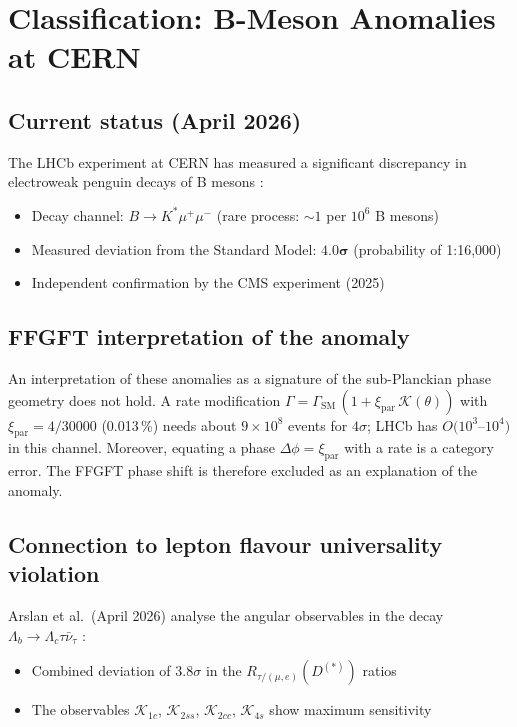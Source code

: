 	\section{Classification: B-Meson Anomalies at CERN}
	
	\subsection{Current status (April 2026)}
	
	The LHCb experiment at CERN has measured a significant discrepancy in electroweak penguin decays of B mesons \cite{CERN2026a, CERN2026b}:
	
	\begin{itemize}
		\item Decay channel: $B \to K^* \mu^+\mu^-$ (rare process: $\sim 1$ per $10^6$ B mesons)
		\item Measured deviation from the Standard Model: $\mathbf{4.0\sigma}$ (probability of 1:16,000)
		\item Independent confirmation by the CMS experiment (2025)
	\end{itemize}
	
	\subsection{FFGFT interpretation of the anomaly}
	
	An interpretation of these anomalies as a signature of the sub-Planckian phase geometry does not hold. A rate modification $\Gamma = \Gamma_{\text{SM}}\,(1 + \xi_{\text{par}}\,\mathcal{K}(\theta))$ with $\xi_{\text{par}} = 4/30000$ (0.013\,\%) needs about $9\times10^8$ events for $4\sigma$; LHCb has $O(10^3$--$10^4)$ in this channel. Moreover, equating a phase $\Delta\phi = \xi_{\text{par}}$ with a rate is a category error. The FFGFT phase shift is therefore excluded as an explanation of the anomaly.
	
	\subsection{Connection to lepton flavour universality violation}
	
	Arslan et al.\ (April 2026) analyse the angular observables in the decay $\Lambda_b \to \Lambda_c \tau \bar{\nu}_\tau$ \cite{Arslan2026}:
	
	\begin{itemize}
		\item Combined deviation of $3.8\sigma$ in the $R_{\tau/(\mu,e)}(D^{(*)})$ ratios
		\item The observables $\mathcal{K}_{1c}$, $\mathcal{K}_{2ss}$, $\mathcal{K}_{2cc}$, $\mathcal{K}_{4s}$ show maximum sensitivity
	\end{itemize}
	
